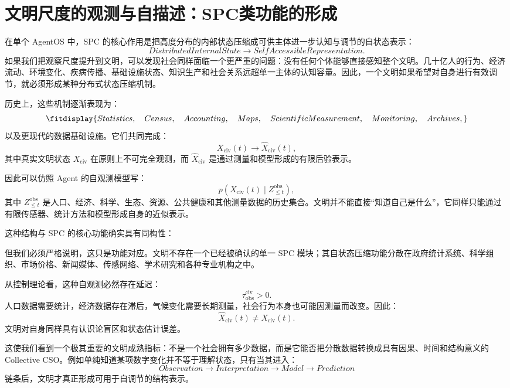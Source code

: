 \section{文明尺度的观测与自描述：SPC类功能的形成}

在单个 AgentOS 中，SPC 的核心作用是把高度分布的内部状态压缩成可供主体进一步认知与调节的自状态表示：
\[
DistributedInternalState
\rightarrow
SelfAccessibleRepresentation.
\]
如果我们把观察尺度提升到文明，可以发现社会同样面临一个更严重的问题：没有任何个体能够直接感知整个文明。几十亿人的行为、经济流动、环境变化、疾病传播、基础设施状态、知识生产和社会关系远超单一主体的认知容量。因此，一个文明如果希望对自身进行有效调节，就必须形成某种分布式状态压缩机制。

历史上，这些机制逐渐表现为：
\[
\fitdisplay{
Statistics,\quad
Census,\quad
Accounting,\quad
Maps,\quad
ScientificMeasurement,\quad
Monitoring,\quad
Archives,
}
\]
以及更现代的数据基础设施。它们共同完成：
\[
X_{\mathrm{civ}}(t)
\rightarrow
\hat X_{\mathrm{civ}}(t),
\]
其中真实文明状态 $X_{\mathrm{civ}}$ 在原则上不可完全观测，而 $\hat X_{\mathrm{civ}}$ 是通过测量和模型形成的有限后验表示。

因此可以仿照 Agent 的自观测模型写：
\[
p\!\left(
X_{\mathrm{civ}}(t)
\mid
Z_{\leq t}^{\mathrm{obs}}
\right),
\]
其中 $Z_{\leq t}^{\mathrm{obs}}$ 是人口、经济、科学、生态、资源、公共健康和其他测量数据的历史集合。文明并不能直接“知道自己是什么”，它同样只能通过有限传感器、统计方法和模型形成自身的近似表示。

这种结构与 SPC 的核心功能确实具有同构性：
\begin{statementbox}
\centering
{}
\end{statementbox}
但我们必须严格说明，这只是功能对应。文明不存在一个已经被确认的单一 SPC 模块；其自状态压缩功能分散在政府统计系统、科学组织、市场价格、新闻媒体、传感网络、学术研究和各种专业机构之中。

从控制理论看，这种自观测必然存在延迟：
\[
\tau_{\mathrm{obs}}^{\mathrm{civ}}>0.
\]
人口数据需要统计，经济数据存在滞后，气候变化需要长期测量，社会行为本身也可能因测量而改变。因此：
\[
\hat X_{\mathrm{civ}}(t)
\neq
X_{\mathrm{civ}}(t).
\]
文明对自身同样具有认识论盲区和状态估计误差。

这使我们看到一个极其重要的文明成熟指标：不是一个社会拥有多少数据，而是它能否把分散数据转换成具有因果、时间和结构意义的 Collective CSO。例如单纯知道某项数字变化并不等于理解状态，只有当其进入：
\[
Observation
\rightarrow
Interpretation
\rightarrow
Model
\rightarrow
Prediction
\]
链条后，文明才真正形成可用于自调节的结构表示。

